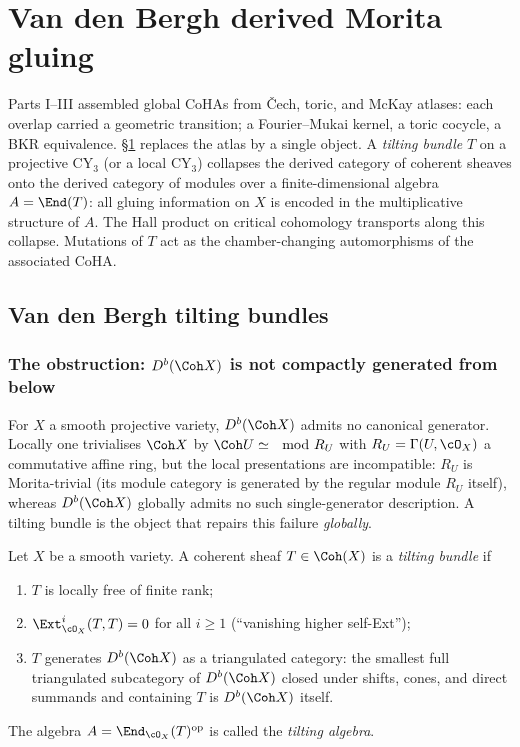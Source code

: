 \section{Van den Bergh derived Morita gluing}
\label{sec:gluing:vdb}
\label{part:gluing-vdb}

Parts I--III assembled global CoHAs from \v{C}ech, toric, and McKay atlases: each
overlap carried a geometric transition; a Fourier--Mukai kernel, a toric
cocycle, a BKR equivalence. \S\ref{sec:gluing:vdb} replaces the atlas by a single object. A
\emph{tilting bundle} $T$ on a projective CY$_3$ (or a local CY$_3$)
collapses the derived category of coherent sheaves onto the derived category of
modules over a finite-dimensional algebra $A = \End(T)$: all gluing
information on $X$ is encoded in the multiplicative structure of $A$. The Hall
product on critical cohomology transports along this collapse. Mutations of $T$
act as the chamber-changing automorphisms of the associated CoHA.

\subsection{Van den Bergh tilting bundles}
\label{sec:vdb-tilting}

\subsubsection{The obstruction: $D^b(\Coh X)$ is not compactly generated from below}

For $X$ a smooth projective variety, $D^b(\Coh X)$ admits no canonical
generator. Locally one trivialises $\Coh X$ by $\Coh U \simeq \mod R_U$ with
$R_U = \Gamma(U,\cO_X)$ a commutative affine ring, but the local presentations
are incompatible: $R_U$ is Morita-trivial (its module category is generated by
the regular module $R_U$ itself), whereas $D^b(\Coh X)$ globally admits no such
single-generator description. A tilting bundle is the object that repairs this
failure \emph{globally}.

\begin{definition}
\label{def:tilting-bundle}
Let $X$ be a smooth variety. A coherent sheaf
$T \in \Coh(X)$ is a \emph{tilting bundle} if
\begin{enumerate}
\item[(T1)] $T$ is locally free of finite rank;
\item[(T2)] $\Ext^{i}_{\cO_X}(T, T) = 0$ for all $i \geq 1$
 (``vanishing higher self-Ext'');
\item[(T3)] $T$ generates $D^{b}(\Coh X)$ as a triangulated category:
 the smallest full triangulated subcategory of $D^{b}(\Coh X)$ closed
 under shifts, cones, and direct summands and containing $T$ is
 $D^{b}(\Coh X)$ itself.
\end{enumerate}
The algebra $A = \End_{\cO_X}(T)^{\mathrm{op}}$ is called the \emph{tilting
algebra}.
\end{definition}

